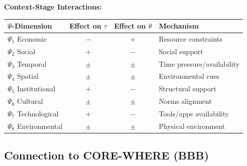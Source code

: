 \begin{tcolorbox}[colback=blue!5!white, colframe=blue!75!black,
    title=Integration: STAGE $\leftrightarrow$ WHEN]
\textbf{Context-Stage Interactions:}
\begin{center}
\begin{tabular}{lccl}
\toprule
$\Psi$-Dimension & Effect on $\tau$ & Effect on $\theta$ & Mechanism \\
\midrule
$\Psi_1$ Economic & $-$ & $+$ & Resource constraints \\
$\Psi_2$ Social & $+$ & $-$ & Social support \\
$\Psi_3$ Temporal & $\pm$ & $\pm$ & Time pressure/availability \\
$\Psi_4$ Spatial & $\pm$ & $\pm$ & Environmental cues \\
$\Psi_5$ Institutional & $+$ & $-$ & Structural support \\
$\Psi_6$ Cultural & $\pm$ & $\pm$ & Norms alignment \\
$\Psi_7$ Technological & $+$ & $-$ & Tools/apps availability \\
$\Psi_8$ Environmental & $\pm$ & $\pm$ & Physical environment \\
\bottomrule
\end{tabular}
\end{center}
\end{tcolorbox}

\subsection{Connection to CORE-WHERE (BBB)}


